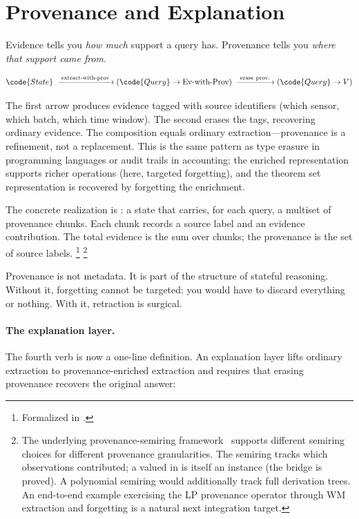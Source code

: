 \documentclass[11pt,openany]{report}
\begin{document}
\section{Provenance and Explanation}
\label{sec:provenance}

Evidence tells you \emph{how much} support a query has.  Provenance
tells you \emph{where that support came from}.

\[
  \code{State}
  \;\xrightarrow{\;\text{extract-with-prov}\;}
  (\code{Query} \to \text{Ev-with-Prov})
  \;\xrightarrow{\;\text{erase prov.}\;}
  (\code{Query} \to V)
\]

\noindent
The first arrow produces evidence tagged with source identifiers
(which sensor, which batch, which time window).  The second erases
the tags, recovering ordinary evidence.  The composition equals
ordinary extraction---provenance is a refinement, not a replacement.
This is the same pattern as type erasure in programming languages or
audit trails in accounting: the enriched representation supports
richer operations (here, targeted forgetting), and the theorem set
representation is recovered by forgetting the enrichment.

The concrete realization is : a state that
carries, for each query, a multiset of provenance chunks.  Each chunk
records a source label and an evidence contribution.  The total
evidence is the sum over chunks; the provenance is the set of source
labels.%
\footnote{Formalized in
.}%
\footnote{The underlying provenance-semiring
framework~\cite{GreenKarvounarakisTannen2007} supports different
semiring choices for different provenance granularities.  The
 semiring tracks which observations contributed; a
 valued in  is itself an
 instance (the bridge is proved).  A
polynomial semiring would additionally track full derivation trees.
An end-to-end example exercising the LP provenance operator
 through WM extraction and forgetting is a natural
next integration target.}

Provenance is not metadata.  It is part of the structure of stateful
reasoning.  Without it, forgetting cannot be targeted: you would have
to discard everything or nothing.  With it, retraction is surgical.

\paragraph{The explanation layer.}
The fourth verb is now a one-line definition.  An explanation layer
lifts ordinary extraction to provenance-enriched extraction and
requires that erasing provenance recovers the original answer:
\end{document}
